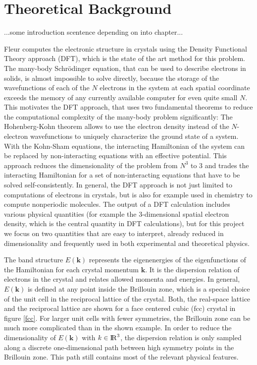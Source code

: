 
\chapter{Theoretical Background}
\label{chap:theory}

...some introduction scentence depending on into chapter...


Fleur computes the electronic structure in crystals using the Density Functional Theory approach (DFT), which is the state of the art method for this problem. The many-body Schrödinger equation, that can be used to describe electrons in solids, is almost impossible to solve directly, because the storage of the wavefunctions of each of the $N$ electrons in the system at each spatial coordinate exceeds the memory of any currently available computer for even quite small $N$. This motivates the DFT approach, that uses two fundamental theorems to reduce the computational complexity of the many-body problem significantly: The Hohenberg-Kohn theorem allows to use the electron density instead of the $N$-electron wavefunctions to uniquely characterize the ground state of a system. With the Kohn-Sham equations, the interacting Hamiltonian of the system can be replaced by non-interacting equations with an effective potential. This approach reduces the dimensionality of the problem from $N^3$ to $3$ and trades the interacting Hamiltonian for a set of non-interacting equations that have to be solved self-consistently. In general, the DFT approach is not just limited to computations of electrons in crystals, but is also for example used in chemistry to compute nonperiodic molecules.
% 
The output of a DFT calculation includes various physical quantities (for example the 3-dimensional spatial electron density, which is the central quantity in DFT calculations), but for this project we focus on two quantities that are easy to interpret, already reduced in dimensionality and frequently used in both experimental and theoretical physics.

The band structure $E(\mathbf{k})$ represents the eigenenergies of the eigenfunctions of the Hamiltonian for each crystal momentum $\mathbf{k}$. It is the dispersion relation of electrons in the crystal and relates allowed momenta and energies. In general, $E(\mathbf{k})$ is defined at any point inside the Brillouin zone, which is a special choice of the unit cell in the reciprocal lattice of the crystal. Both, the real-space lattice and the reciprocal lattice are shown for a face centered cubic (fcc) crystal in figure \ref{fcc}. For larger unit cells with fewer symmetries, the Brillouin zone can be much more complicated than in the shown example. In order to reduce the dimensionality of $E(\mathbf{k})$ with $k \in {\rm I\!R}^3$, the dispersion relation is only sampled along a discrete one-dimensional path between high symmetry points in the Brillouin zone. This path still contains most of the relevant physical features.

